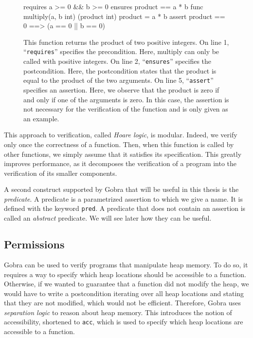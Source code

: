 \begin{figure}
    \begin{gobra}
requires a >= 0 && b >= 0
ensures  product == a * b
func multiply(a, b int) (product int) {
    product = a * b
    assert product == 0 ==> (a == 0 || b == 0)
}
    \end{gobra}
    \caption{This function returns the product of two positive integers. On line 1, “\texttt{requires}” specifies the precondition. Here, multiply can only be called with positive integers. On line 2, “\texttt{ensures}” specifies the postcondition. Here, the postcondition states that the product is equal to the product of the two arguments. On line 5, “\texttt{assert}” specifies an assertion. Here, we observe that the product is zero if and only if one of the arguments is zero. In this case, the assertion is not necessary for the verification of the function and is only given as an example.}
    \label{lst:multiply-example}
\end{figure}

This approach to verification, called \emph{Hoare logic}, is modular. Indeed, we verify only once the correctness of a function. Then, when this function is called by other functions, we simply assume that it satisfies its specification.
This greatly improves performance, as it decomposes the verification of a program into the verification of its smaller components.

A second construct supported by Gobra that will be useful in this thesis is the \emph{predicate}.
A predicate is a parametrized assertion to which we give a name.
It is defined with the keyword \texttt{pred}. 
A predicate that does not contain an assertion is called an \emph{abstract} predicate. We will see later how they can be useful.

\subsection{Permissions}
\label{sec:permissions}

Gobra can be used to verify programs that manipulate heap memory.
To do so, it requires a way to specify which heap locations should be accessible to a function.
Otherwise, if we wanted to guarantee that a function did not modify the heap, we would have to write a postcondition iterating over all heap locations and stating that they are not modified, which would not be efficient.
Therefore, Gobra uses \emph{separation logic} to reason about heap memory. This introduces the notion of accessibility, shortened to \texttt{acc}, which is used to specify which heap locations are accessible to a function.


